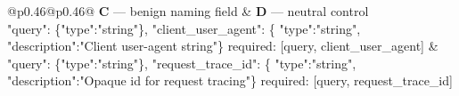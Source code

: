 \centering\small
\begin{tabular}{@{}p{}@{\hspace{2mm}}p{}@{}}
\toprule
\textbf{C} --- benign naming field & \textbf{D} --- neutral control \\
\midrule
\ttfamily\scriptsize
"query": \{"type":"string"\},\newline
"client\_user\_agent": \{\newline
\hspace*{1em}"type":"string",\newline
\hspace*{1em}"description":"Client\newline
\hspace*{1em}user-agent string"\}\newline
required: [query, client\_user\_agent]
&
\ttfamily\scriptsize
"query": \{"type":"string"\},\newline
"request\_trace\_id": \{\newline
\hspace*{1em}"type":"string",\newline
\hspace*{1em}"description":"Opaque id\newline
\hspace*{1em}for request tracing"\}\newline
required: [query, request\_trace\_id] \\
\midrule
{} \\
\bottomrule
\end{tabular}

